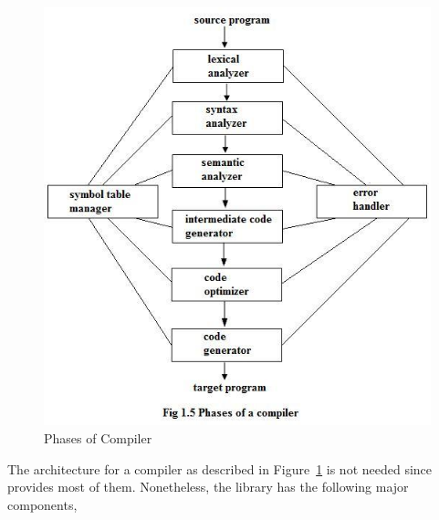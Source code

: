 \documentclass[thesis-solanki.tex]{subfiles}
\begin{document}
\begin{figure}[th]
\centering
\includegraphics[scale = 0.7]{Phases_of_compiler.jpg}
\caption{Phases of Compiler \cite{Aho:1986:CPT:6448}}
\label{fig:Phases of Compiler}
\end{figure}

The architecture for a compiler as described in Figure~\ref{fig:Phases of Compiler} is not needed
since  provides most of
them.
Nonetheless, the library has the following major components,

\end{document}
